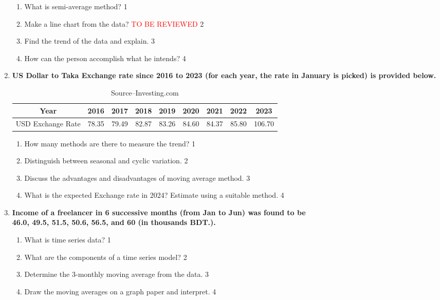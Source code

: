 \documentclass[a4paper,oneside]{book}
\begin{document}
\begin{enumerate}
  \begin{enumerate}
    \item
	What is semi-average method? \hfill 1
    \item
	Make a line chart from the data? \textcolor{red}{TO BE REVIEWED} \hfill 2
    \item  
	Find the trend of the data and explain. \hfill 3
    \item
	How can the person accomplish what he intends? \hfill 4
  \end{enumerate}
  
  \item
	  \textbf{US Dollar to Taka Exchange rate since 2016 to 2023 (for each year, the rate in January is picked) is provided below. } 
  
  \begin{table}[h]
  \centering
\begin{tabular}{c|c|c|c|c|c|c|c|c}
Year & 2016 & 2017 & 2018 & 2019 & 2020 & 2021 & 2022 & 2023 \\ \hline
USD Exchange Rate & 78.35 & 79.49 & 82.87 & 83.26 & 84.60 & 84.37 & 85.80 & 106.70
\end{tabular}
\caption{\label{usdrate}Source--Investing.com}
\end{table}
  
  
  \begin{enumerate}
    \item
	How many methods are there to measure the trend? \hfill 1
    \item
	Distinguish between seasonal and cyclic variation. \hfill 2
    \item  
	Discuss the advantages and disadvantages of moving average method. \hfill 3
    \item
	What is the expected Exchange rate in 2024? Estimate using a suitable method. \hfill 4
  \end{enumerate}

 \item
	  \textbf{Income of a freelancer in 6 successive months (from Jan to Jun) was found to be \\ 46.0, 49.5, 51.5, 50.6, 56.5, and 60 (in thousands BDT.).}
  \begin{enumerate}
    \item
	What is time series data? \hfill 1
    \item
	What are the components of a time series model? \hfill 2
    \item  
	Determine the 3-monthly moving average from the data. \hfill 3
    \item
	Draw the moving averages on a graph paper and interpret. \hfill 4
\end{enumerate}


\end{enumerate}
\end{document}

